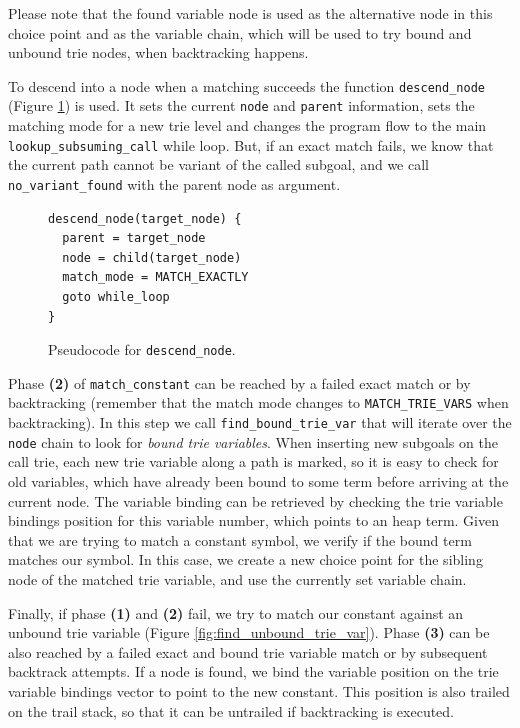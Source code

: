 Please note that the found variable node is used as the alternative node in this choice point
and as the variable chain, which will be used to try bound and unbound trie nodes, when backtracking happens.

To descend into a node when a matching succeeds the function \texttt{descend\_node} (Figure \ref{fig:descend_node})
is used. It sets the current \texttt{node} and \texttt{parent} information, sets the matching mode for a new trie level
and changes the program flow to the main \texttt{lookup\_subsuming\_call} while loop. But,
if an exact match fails, we know that the current path cannot be variant of the called subgoal, and we call
\texttt{no\_variant\_found} with the parent node as argument.

\begin{figure}[ht]
\begin{Verbatim}[fontsize=\small]
descend_node(target_node) {
  parent = target_node
  node = child(target_node)
  match_mode = MATCH_EXACTLY
  goto while_loop
}
\end{Verbatim}
\caption{Pseudo\-code for \texttt{descend\_node}.}
\label{fig:descend_node}
\end{figure}

Phase \textbf{(2)} of \texttt{match\_constant} can be reached by a failed exact match or by backtracking
(remember that the match mode changes to \texttt{MATCH\_TRIE\_VARS} when backtracking). In this step
we call \texttt{find\_bound\_trie\_var} that will iterate over the \texttt{node} chain to look for
\textit{bound trie variables}. When inserting new subgoals on the call trie, each new trie variable
along a path is marked, so it is easy to check for old variables, which have already been bound
to some term before arriving at the current node. The variable binding can be retrieved by
checking the trie variable bindings position for this variable number, which points to an heap term.
Given that we are trying to match a constant symbol, we verify if the bound term matches our symbol.
In this case, we create a new choice point for the sibling node of the matched trie variable, and use
the currently set variable chain.

Finally, if phase \textbf{(1)} and \textbf{(2)} fail, we try to match our constant against an unbound trie variable
(Figure \ref{fig:find_unbound_trie_var}).
Phase \textbf{(3)} can be also reached by a failed exact and bound trie variable match or by subsequent backtrack
attempts. If a node is found, we bind the variable position on the trie variable bindings
vector to point to the new constant. This position is also trailed on the trail stack, so that it can be untrailed
if backtracking is executed.

